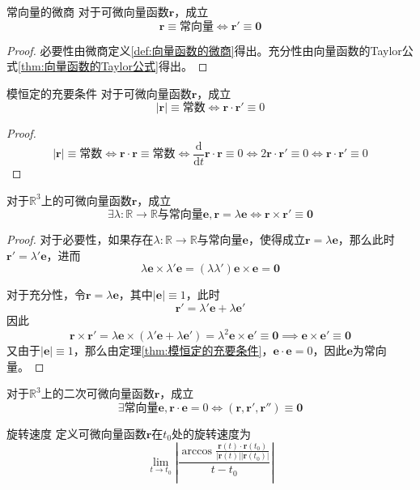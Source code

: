 \documentclass[lang = cn, scheme = chinese, thmcnt = section]{elegantbook}
\newcommand{\R}{\mathbb{R}}            %
\newcommand{\bs}{\boldsymbol}          %
\newcommand{\dd}{\mathrm{d}}           %
\begin{document}
\begin{lemma}{}{常向量的微商}
	对于可微向量函数$\bs{r}$，成立
	$$
	\bs{r}\equiv\text{常向量}
	\iff 
	\bs{r}'\equiv \bs{0}
	$$
\end{lemma}

\begin{proof}
	必要性由微商定义\ref{def:向量函数的微商}得出。充分性由向量函数的Taylor公式\ref{thm:向量函数的Taylor公式}得出。
\end{proof}

\begin{theorem}{}{模恒定的充要条件}
	对于可微向量函数$\bs{r}$，成立
	$$
	|\bs{r}|\equiv \text{常数}\iff \bs{r}\cdot \bs{r}'\equiv 0
	$$
\end{theorem}

\begin{proof}
	$$
	|\bs{r}|\equiv \text{常数}
	\iff \bs{r}\cdot \bs{r}\equiv \text{常数}
	\iff \frac{\dd}{\dd t}\bs{r}\cdot \bs{r}\equiv 0
	\iff 2\bs{r}\cdot \bs{r}'\equiv 0
	\iff\bs{r}\cdot \bs{r}'\equiv 0
	$$
\end{proof}

\begin{theorem}
	对于$\R^3$上的可微向量函数$\bs{r}$，成立
	$$
	\exists\lambda:\R\to\R\text{与常向量}\bs{e},\bs{r}=\lambda \bs{e}\iff \bs{r}\times \bs{r}'\equiv \bs{0}
	$$
\end{theorem}

\begin{proof}
	对于必要性，如果存在$\lambda:\R\to\R$与常向量$\bs{e}$，使得成立$\bs{r}=\lambda\bs{e}$，那么此时$\bs{r}'=\lambda'\bs{e}$，进而
	$$
	\lambda\bs{e}\times \lambda'\bs{e}=(\lambda\lambda')\bs{e}\times\bs{e}=\bs{0}
	$$
	
	对于充分性，令$\bs{r}=\lambda\bs{e}$，其中$|\bs{e}|\equiv1$，此时
	$$
	\bs{r}'=\lambda'\bs{e}+\lambda\bs{e}'
	$$
	因此
	$$
	\bs{r}\times \bs{r}'
	=\lambda\bs{e}\times (\lambda'\bs{e}+\lambda\bs{e}')
	=\lambda^2\bs{e}\times\bs{e}'
	\equiv\bs{0}\implies 
	\bs{e}\times\bs{e}'\equiv\bs{0}
	$$
	又由于$|\bs{e}|\equiv1$，那么由定理\ref{thm:模恒定的充要条件}，$\bs{e}\cdot\bs{e}=0$，因此$\bs{e}$为常向量。
\end{proof}

\begin{theorem}
	对于$\R^3$上的二次可微向量函数$\bs{r}$，成立
	$$
	\exists\text{常向量}\bs{e},\bs{r}\cdot\bs{e}=0\iff (\bs{r},\bs{r}',\bs{r}'')\equiv \bs{0}
	$$
\end{theorem}

\begin{definition}{旋转速度}
	定义可微向量函数$\bs{r}$在$t_0$处的旋转速度为
	$$
	\lim_{t\to t_0}\left|\frac{\arccos\frac{\bs{r}(t)\cdot\bs{r}(t_0)}{|\bs{r}(t)||\bs{r}(t_0)|}}{t-t_0}\right|
	$$
\end{definition}
\end{document}
